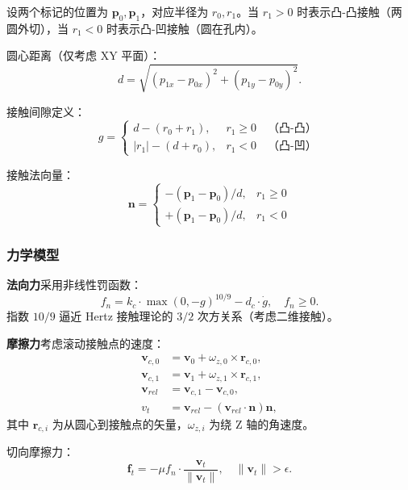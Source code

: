 \documentclass[12pt]{ctexart}
\begin{document}
设两个标记的位置为 $\mathbf{p}_0, \mathbf{p}_1$，对应半径为 $r_0, r_1$。当 $r_1 > 0$ 时表示凸-凸接触（两圆外切），当 $r_1 < 0$ 时表示凸-凹接触（圆在孔内）。

圆心距离（仅考虑 XY 平面）：
\begin{equation}
d = \sqrt{(p_{1x} - p_{0x})^2 + (p_{1y} - p_{0y})^2}.
\end{equation}

接触间隙定义：
\begin{equation}
g = \begin{cases}
d - (r_0 + r_1), & r_1 \geq 0 \quad \text{（凸-凸）} \\ |r_1| - (d + r_0), & r_1 < 0 \quad \text{（凸-凹）}
\end{cases}
\end{equation}

接触法向量：
\begin{equation}
\mathbf{n} = \begin{cases}
-(\mathbf{p}_1 - \mathbf{p}_0) / d, & r_1 \geq 0 \\ +(\mathbf{p}_1 - \mathbf{p}_0) / d, & r_1 < 0
\end{cases}
\end{equation}

\subsubsection{力学模型}

\textbf{法向力}采用非线性罚函数：
\begin{equation}
f_n = k_c \cdot \max(0, -g)^{10/9} - d_c \cdot \dot{g}, \quad f_n \geq 0.
\end{equation}
指数 $10/9$ 逼近 Hertz 接触理论的 $3/2$ 次方关系（考虑二维接触）。

\textbf{摩擦力}考虑滚动接触点的速度：
\begin{align}
\mathbf{v}_{c,0} &= \mathbf{v}_0 + \omega_{z,0} \times \mathbf{r}_{c,0}, \\ 
\mathbf{v}_{c,1} &= \mathbf{v}_1 + \omega_{z,1} \times \mathbf{r}_{c,1}, \\ 
\mathbf{v}_{rel} &= \mathbf{v}_{c,1} - \mathbf{v}_{c,0}, \\ v_t &= \mathbf{v}_{rel} - (\mathbf{v}_{rel} \cdot \mathbf{n})\mathbf{n},
\end{align}
其中 $\mathbf{r}_{c,i}$ 为从圆心到接触点的矢量，$\omega_{z,i}$ 为绕 Z 轴的角速度。

切向摩擦力：
\begin{equation}
\mathbf{f}_t = -\mu f_n \cdot \frac{\mathbf{v}_t}{\|\mathbf{v}_t\|}, \quad \|\mathbf{v}_t\| > \epsilon.
\end{equation}
\end{document}
